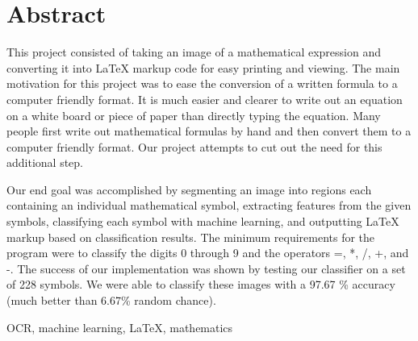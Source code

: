 \section{Abstract}

This project consisted of taking an image of a mathematical expression and converting it into LaTeX markup code for easy printing and viewing.  The main motivation for this project was to ease the conversion of a written formula to a computer friendly format.  It is much easier and clearer to write out an equation on a white board or piece of paper than directly typing the equation. Many people first write out mathematical formulas by hand and then convert them to a computer friendly format.  Our project attempts to cut out the need for this additional step.  

Our end goal was accomplished by segmenting an image into regions each containing an individual mathematical symbol, extracting features from the given symbols, classifying each symbol with machine learning, and outputting LaTeX markup based on classification results.  The minimum requirements for the program were to classify the digits 0 through 9 and the operators =, *, /, +, and -.  The success of our implementation was shown by testing our classifier on a set of 228 symbols. We were able to classify these images with a 97.67
\% accuracy (much better than 6.67\% random chance).

\begin{keywords}
OCR, machine learning, LaTeX, mathematics
\end{keywords}